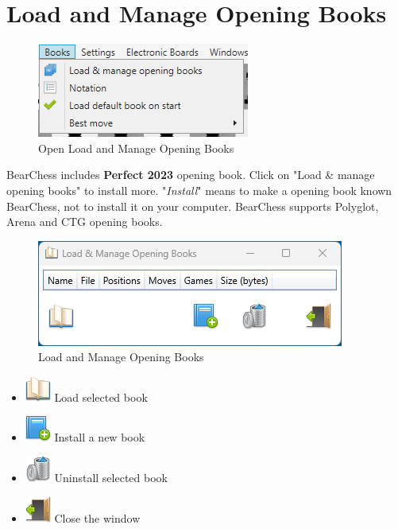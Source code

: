 \documentclass[11pt,a4paper]{article}
\begin{document}
	\section{Load and Manage Opening Books} \label{OpeningBooks}
	
	\begin{figure}[H]
		\centering
		\includegraphics[scale=1.0]{books.png}
		\caption{Open Load and Manage Opening Books  }
		\label{fig:LoadManageBooks1}
	\end{figure}
	
	BearChess includes \textbf{Perfect 2023} opening book. Click on "Load \& manage opening books" to install more. "\textit{Install}" means to make a opening book known BearChess, not to install it on your computer. BearChess supports Polyglot, Arena and CTG opening books.\\
	
	\begin{figure}[H]
		\centering
		\includegraphics[scale=1.0]{LoadManageBooks2.png}
		\caption{Load and Manage Opening Books  }
		\label{fig:LoadManageBooks2}
	\end{figure}
	
	\begin{itemize}
		\item \includegraphics[scale=0.5]{book_open.png} Load selected book
		\item \includegraphics[scale=0.5]{book_add.png} Install a new book
		\item \includegraphics[scale=0.5]{bin.png} Uninstall selected book
		\item \includegraphics[scale=0.5]{door_out.png} Close the window
	\end{itemize}
	
\end{document}
